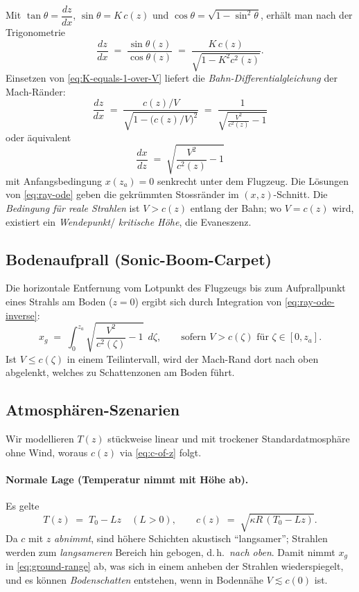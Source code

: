 Mit $\tan\theta = \dfrac{dz}{dx}$, $\sin\theta = K\,c(z)$ und
$\cos\theta = \sqrt{1 - \sin^2\theta}$,
erhält man nach der Trigonometrie
\begin{equation}
    \frac{dz}{dx} \;=\; \frac{\sin\theta(z)}{\cos\theta(z)} \;=\;
    \frac{K\,c(z)}{\sqrt{1 - K^2 c^2(z)}}.
\end{equation}
Einsetzen von \eqref{eq:K-equals-1-over-V} liefert die
\emph{Bahn-Differentialgleichung} der Mach-Ränder:
\begin{equation}
    \quad
    \frac{dz}{dx} \;=\; \frac{c(z)/V}{\sqrt{1 - \big(c(z)/V\big)^2}}
    \;=\; \frac{1}{\sqrt{\frac{V^2}{c^2(z)} - 1}}
    \quad
    \label{eq:ray-ode}
\end{equation}
oder äquivalent
\begin{equation}
    \quad
    \frac{dx}{dz} \;=\; \sqrt{\frac{V^2}{c^2(z)} - 1}
    \quad
    \label{eq:ray-ode-inverse}
\end{equation}
mit Anfangsbedingung $x(z_a)=0$ senkrecht unter dem Flugzeug.
Die Lösungen von \eqref{eq:ray-ode} geben die gekrümmten Stossränder
im $(x,z)$-Schnitt.
Die \emph{Bedingung für reale Strahlen} ist $V>c(z)$ entlang der Bahn;
wo $V=c(z)$ wird, existiert ein \emph{Wendepunkt}/
\emph{kritische Höhe}, die Evaneszenz.

\subsection{Bodenaufprall (Sonic-Boom-Carpet)}
Die horizontale Entfernung vom Lotpunkt des Flugzeugs bis zum
Aufprallpunkt eines Strahls am Boden ($z=0$) ergibt sich durch
Integration von \eqref{eq:ray-ode-inverse}:
\begin{equation}
    \quad
    x_g \;=\; \int_{0}^{z_a} \sqrt{\frac{V^2}{c^2(\zeta)} - 1}\;\, d\zeta,
    \qquad \text{sofern } V>c(\zeta) \text{ für } \zeta\in[0,z_a].
    \quad
    \label{eq:ground-range}
\end{equation}
Ist $V\le c(\zeta)$ in einem Teilintervall, wird der Mach-Rand dort
nach oben abgelenkt, welches zu Schattenzonen am Boden führt.

\subsection{Atmosphären-Szenarien}
Wir modellieren $T(z)$ stückweise linear und mit trockener
Standardatmosphäre ohne Wind, woraus $c(z)$ via \eqref{eq:c-of-z} folgt.

\paragraph{Normale Lage (Temperatur nimmt mit Höhe ab).}
Es gelte
\begin{equation}
    T(z) \;=\; T_0 - Lz \quad (L>0),
    \qquad
    c(z) \;=\; \sqrt{\kappa R\,(T_0 - Lz)} .
    \label{eq:normal-lapse}
\end{equation}
Da $c$ mit $z$ \emph{abnimmt}, sind höhere Schichten akustisch
``langsamer''; Strahlen werden zum \emph{langsameren} Bereich hin
gebogen, d.\,h.\ \emph{nach oben}.
Damit nimmt $x_g$ in \eqref{eq:ground-range} ab, was sich in einem anheben
der Strahlen wiederspiegelt, und es können \emph{Bodenschatten}
entstehen, wenn in Bodennähe $V\lesssim c(0)$ ist.

